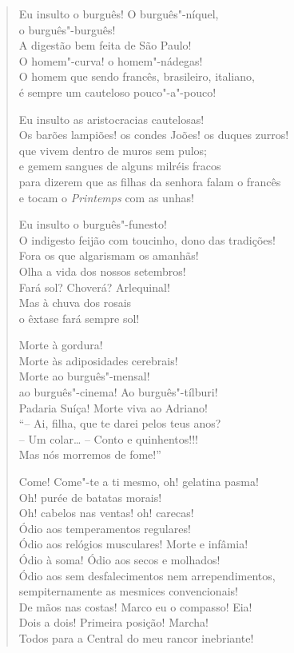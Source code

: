 \begin{verse}
Eu insulto o burguês! O burguês"-níquel,\\
o burguês"-burguês!\\
A digestão bem feita de São Paulo!\\
O homem"-curva! o homem"-nádegas!\\
O homem que sendo francês, brasileiro, italiano,\\
é sempre um cauteloso pouco"-a"-pouco!

Eu insulto as aristocracias cautelosas!\\
Os barões lampiões! os condes Joões! os duques zurros!\\
que vivem dentro de muros sem pulos;\\
e gemem sangues de alguns milréis fracos\\
para dizerem que as filhas da senhora falam o francês\\
e tocam o \emph{Printemps} com as unhas!

Eu insulto o burguês"-funesto!\\
O indigesto feijão com toucinho, dono das tradições!\\
Fora os que algarismam os amanhãs!\\
Olha a vida dos nossos setembros!\\
Fará sol? Choverá? Arlequinal!\\
Mas à chuva dos rosais\\
o êxtase fará sempre sol!

Morte à gordura!\\
Morte às adiposidades cerebrais!\\
Morte ao burguês"-mensal!\\
ao burguês"-cinema! Ao burguês"-tílburi!\\
Padaria Suíça! Morte viva ao Adriano!\\
``-- Ai, filha, que te darei pelos teus anos?\\
-- Um colar\ldots{} -- Conto e quinhentos!\mbox{}!\mbox{}!\\
Mas nós morremos de fome!''

Come! Come"-te a ti mesmo, oh! gelatina pasma!\\
Oh! purée de batatas morais!\\
Oh! cabelos nas ventas! oh! carecas!\\
Ódio aos temperamentos regulares!\\
Ódio aos relógios musculares! Morte e infâmia!\\
Ódio à soma! Ódio aos secos e molhados!\\
Ódio aos sem desfalecimentos nem arrependimentos,\\
sempiternamente as mesmices convencionais!\\
De mãos nas costas! Marco eu o compasso! Eia!\\
Dois a dois! Primeira posição! Marcha!\\
Todos para a Central do meu rancor inebriante!


\end{verse}
